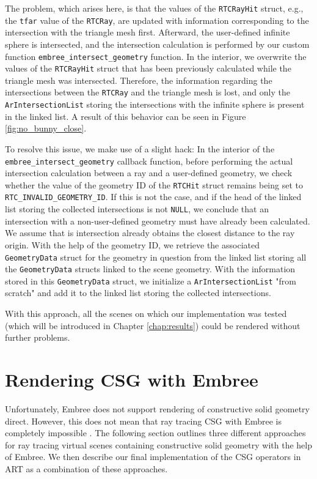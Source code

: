 The problem, which arises here, is that the values of the \texttt{RTCRayHit} struct, e.g., the \texttt{tfar} value of the \texttt{RTCRay}, are updated with information corresponding to the intersection with the triangle mesh first. Afterward, the user-defined infinite sphere is intersected, and the intersection calculation is performed by our custom function \texttt{embree\_intersect\_geometry} function. In the interior, we overwrite the values of the \texttt{RTCRayHit} struct that has been previously calculated while the triangle mesh was intersected. Therefore, the information regarding the intersections between the \texttt{RTCRay} and the triangle mesh is lost, and only the \texttt{ArIntersectionList} storing the intersections with the infinite sphere is present in the linked list. A result of this behavior can be seen in Figure \ref{fig:no_bunny_close}.

To resolve this issue, we make use of a slight hack: In the interior of the \texttt{embree\_intersect\_geometry} callback function, before performing the actual intersection calculation between a ray and a user-defined geometry, we check whether the value of the geometry ID of the \texttt{RTCHit} struct remains being set to \texttt{RTC\_INVALID\_GEOMETRY\_ID}. If this is not the case, and if the head of the linked list storing the collected intersections is not \texttt{NULL}, we conclude that an intersection with a non-user-defined geometry must have already been calculated. We assume that is intersection already obtains the closest distance to the ray origin. With the help of the geometry ID, we retrieve the associated \texttt{GeometryData} struct for the geometry in question from the linked list storing all the \texttt{GeometryData} structs linked to the scene geometry. With the information stored in this \texttt{GeometryData} struct, we initialize a \texttt{ArIntersectionList} "from scratch" and add it to the linked list storing the collected intersections.

With this approach, all the scenes on which our implementation was tested (which will be introduced in Chapter \ref{chap:results}) could be rendered without further problems.


\section{Rendering CSG with Embree}
\label{sec:embree_csg}

Unfortunately, Embree does not support rendering of constructive solid geometry direct. However, this does not mean that ray tracing CSG with Embree is completely impossible . The following section outlines three different approaches for ray tracing virtual scenes containing constructive solid geometry with the help of Embree. We then describe our final implementation of the CSG operators in ART as a combination of these approaches.

